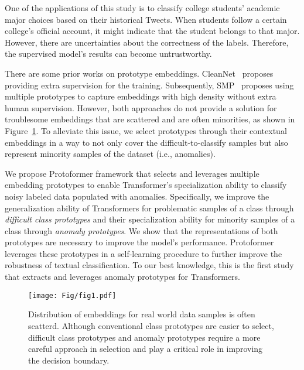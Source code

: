 \documentclass[letterpaper]{article} \usepackage{aaai22}  \usepackage{times}  \usepackage{helvet}  \usepackage{courier}  \usepackage{amsmath,amssymb}
\begin{document}
One of the applications of this study is to classify college students' academic major choices based on their historical Tweets. When students follow a certain college's official account, it might indicate that the student belongs to that major. However, there are uncertainties about the correctness of the labels.
Therefore, the supervised model's results can become untrustworthy.


There are some prior works on prototype embeddings. CleanNet~\cite{lee2018cleannet} proposes providing extra supervision for the training. Subsequently, SMP~\cite{han2019noisy} proposes using multiple prototypes to capture embeddings with high density without extra human supervision. However, both approaches do not provide a solution for troublesome embeddings that are scattered and are often minorities, as shown in Figure~\ref{fig:Intro}.
To alleviate this issue, we select prototypes through their contextual embeddings in a way to not only cover the difficult-to-classify samples but also represent minority samples of the dataset (i.e., anomalies).

We propose Protoformer framework that selects and leverages multiple embedding prototypes to enable Transformer's specialization ability to classify noisy labeled data populated with anomalies.
Specifically, we improve the generalization ability of Transformers for problematic samples of a class through \textit{difficult class prototypes} and their specialization ability for minority samples of a class through \textit{anomaly prototypes}. We show that the representations of both prototypes are necessary to improve the model's performance. Protoformer leverages these prototypes in a self-learning procedure to further improve the robustness of textual classification. To our best knowledge, this is the first study that extracts and leverages anomaly prototypes for Transformers.

\begin{figure}[!t]
 \centering
 \texttt{[image: Fig/fig1.pdf]}
 \caption{Distribution of embeddings for real world data samples is often scatterd. Although conventional class prototypes are easier to select, difficult class prototypes and anomaly prototypes require a more careful approach in selection and play a critical role in improving the decision boundary.}
 \label{fig:Intro}
  \vspace{-5mm}

\end{figure}
\end{document}
